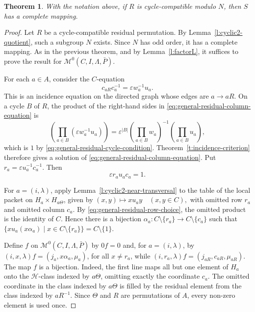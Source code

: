 \documentclass[11pt]{article}
\theoremstyle{plain}
\newtheorem{theorem}{Theorem}[section]
\theoremstyle{remark}
\theoremstyle{definition}
\theoremstyle{plain}
\begin{document}
\begin{theorem}\label{t:Rees0-general-residual-routing}
With the notation above, if $R$ is cycle-compatible modulo $N$, then $S$
has a complete mapping.
\end{theorem}
\endgroup

\begin{proof}
Let $R$ be a cycle-compatible residual permutation.
By Lemma~\ref{l:cyclic2-quotient}, such a subgroup $N$ exists. Since $N$ has
odd order, it has a complete mapping. As in the previous theorem, and by Lemma~\ref{l:factorL}, it suffices
to prove the result for
$ \mathcal M^0(C,I,\Lambda,\bar P)$. 

For each $a\in A$, consider the $C$-equation
              \begin{equation}\label{eq:general-residual-column-equation}
        c_{aR}c_a^{-1}=\varepsilon w_a^{-1}u_a.
\end{equation}
This is an incidence equation on the directed graph whose edges are
$a\to aR$. On a cycle $B$ of $R$, the product of the right-hand sides in
\eqref{eq:general-residual-column-equation} is
\[
        \left(\prod_{a\in B}\left(\varepsilon w_a^{-1}u_a\right)\right)
        =
        \varepsilon^{|B|}
        \left(\prod_{a\in B}w_a\right)^{-1}
        \left(\prod_{a\in B}u_a\right),
\]
which is $1$ by \eqref{eq:general-residual-cycle-condition}. Theorem~\ref{t:incidence-criterion}
therefore gives a solution of \eqref{eq:general-residual-column-equation}.
Put
\(r_a=\varepsilon u_a^{-1}c_a^{-1}.\)
Then
\begin{equation}\label{eq:general-residual-row-choice}
        \varepsilon r_au_ac_a=1.
\end{equation}

For $a=(i,\lambda)$, apply Lemma~\ref{l:cyclic2-near-transversal} to the table of the local packet on $H_a \times H_{a\Theta}$, given by
\((x,y)\longmapsto xu_ay \quad(x,y\in C),\)
with omitted row $r_a$ and omitted column $c_a$. By
\eqref{eq:general-residual-row-choice}, the omitted product is the identity
of $C$. Hence there is a bijection
\(\alpha_a\colon C\setminus\{r_a\}\longrightarrow C\setminus\{c_a\}\)
such that
\(\{xu_a(x\alpha_a)\mid x\in C\setminus\{r_a\}\}=C\setminus\{1\}.\)

Define $f$ on $\mathcal M^0(C,I,\Lambda,\bar P)$ by $0f=0$ and, for
$a=(i,\lambda)$, by \((i,x,\lambda)f=(j_a,x\alpha_a,\mu_a)\), for all \(x\ne r_a\), while \((i,r_a,\lambda)f=(j_{aR},c_{aR},\mu_{aR})\).
The map $f$ is a bijection. Indeed, the first line maps all but one element of
$H_a$ onto the $\mathcal H$-class indexed by $a\Theta$, omitting exactly the
coordinate $c_a$. The omitted coordinate in the class indexed by $a\Theta$ is
filled by the residual element from the class indexed by $aR^{-1}$. Since
$\Theta$ and $R$ are permutations of $A$, every non-zero element is used once.


\end{proof}
\end{document}
